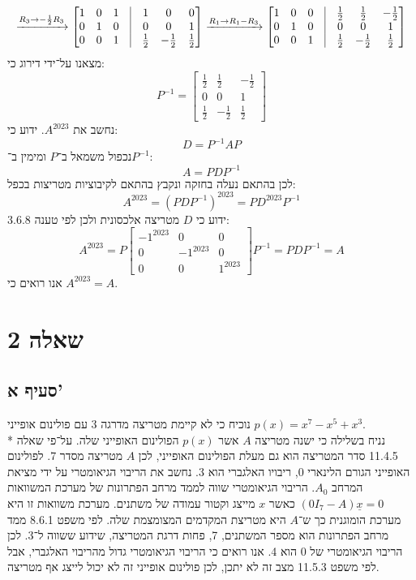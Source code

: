 \documentclass[a4paper,10pt]{article}
\begin{document}
\[
	\xrightarrow{R_3 \rightarrow - \frac{1}{2} R_3}
	\begin{bmatrix}
		1 & 0 & 1 & \vline & 1 & 0 & 0 \\
		0 & 1 & 0 & \vline & 0 & 0 & 1 \\
		0 & 0 & 1 & \vline & {\frac{1}{2}} & -{\frac{1}{2}} & {\frac{1}{2}}
	\end{bmatrix}
	\xrightarrow{R_1 \rightarrow R_1 - R_3}
	\begin{bmatrix}
		1 & 0 & 0 & \vline & {\frac{1}{2}} & {\frac{1}{2}} & -{\frac{1}{2}} \\
		0 & 1 & 0 & \vline & 0 & 0 & 1 \\
		0 & 0 & 1 & \vline & {\frac{1}{2}} & -{\frac{1}{2}} & {\frac{1}{2}}
	\end{bmatrix}
\]
מצאנו על־ידי דירוג כי:
\[
	P^{-1} =
	\begin{bmatrix}
		{\frac{1}{2}} & {\frac{1}{2}} & -{\frac{1}{2}} \\
		0 & 0 & 1 \\
		{\frac{1}{2}} & -{\frac{1}{2}} & {\frac{1}{2}}
	\end{bmatrix}
\]
נחשב את $A^{2023}$. ידוע כי:
\[
	D = P^{-1} A P
\]
נכפול משמאל ב־$P$ ומימין ב־$P^{-1}$:
\[
	A = P D P^{-1}
\]
לכן בהתאם נעלה בחזקה ונקבץ בהתאם לקיבוציות מטריצות בכפל:
\[
	A^{2023} = {(P D P^{-1})}^{2023} = P D^{2023} P^{-1}
\]
ידוע כי $D$ מטריצה אלכסונית ולכן לפי טענה 3.6.8:
\[
	A^{2023} = P
	\begin{bmatrix}
		{-1}^{2023} & 0 & 0 \\
		0 & {-1}^{2023} & 0 \\
		0 & 0 & 1^{2023}
	\end{bmatrix}
	P^{-1}
	= P D P^{-1}
	= A
\]
אנו רואים כי $A^{2023} = A$.

\section{שאלה 2}
\subsection{סעיף א'}
נוכיח כי לא קיימת מטריצה מדרגה 3 עם פולינום אופייני
$p(x) = x^7 - x^5 + x^3$. \\*
נניח בשלילה כי ישנה מטריצה $A$ אשר $p(x)$ הפולינום האופייני שלה.
על־פי שאלה 11.4.5 סדר המטריצה הוא גם מעלת הפולינום האופייני,
לכן $A$ מטריצה מסדר 7. לפולינום האופייני הגורם הלינארי 0,
ריבויו האלגברי הוא 3.
נחשב את הריבוי הגיאומטרי על ידי מציאת המרחב $A_0$.
הריבוי הגיאומטרי שווה לממד מרחב הפתרונות של מערכת המשוואות
$(0I_7 - A) \underline{x} = 0$ כאשר $x$ מייצג וקטור עמודה של משתנים.
מערכת משוואות זו היא מערכת הומוגנית כך ש־$A$
היא מטריצת המקדמים המצומצמת שלה.
לפי משפט 8.6.1 ממד מרחב הפתרונות הוא מספר המשתנים, 7,
פחות דרגת המטריצה, שידוע ששווה ל־3. לכן הריבוי הגיאומטרי של 0 הוא 4.
אנו רואים כי הריבוי הגיאומטרי גדול מהריבוי האלגברי,
אבל לפי משפט 11.5.3 מצב זה לא יתכן, לכן פולינום אופייני זה לא יכול לייצג אף מטריצה.
\end{document}
